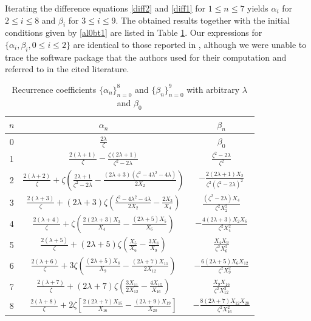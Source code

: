 \documentclass[11pt,a4paper]{article}
\numberwithin{equation}{section}
\begin{document}
Iterating the difference equations \eqref{diff2} and \eqref{diff1} for $1\leq n\leq7$ yields $\alpha_i$ for $2\leq i\leq8$ and $\beta_i$ for $3\leq i\leq9$. The obtained results together with the initial conditions given by \eqref{al0bt1} are listed in Table \ref{Table-1}. Our expressions for $\{\alpha_i,\beta_i, 0\leq i\leq 2\}$ are identical to those reported in \cite[Table 1]{MCM}, although we were unable to trace the software package that the authors used for their computation and referred to in the cited literature.
\begin{table}[H]
\centering
\renewcommand{\arraystretch}{1.2}
\setlength{\tabcolsep}{3pt}
\caption{Recurrence coefficients $\{\alpha_n\}_{n=0}^8$ and $\{\beta_n\}_{n=0}^9$ with arbitrary $\lambda$ and  $\beta_0$}\label{Table-1}
\begin{tabular}{|c|c|c|}
\hline
$n$ & $\alpha_n$ & $\beta_n$\\
\hline
0 & $\frac{2\lambda}{\zeta}$ & $\beta_{0}$ \\
\hline
1 & $\frac{2(\lambda+1)}{\zeta}-\frac{\zeta(2\lambda+1)}{\zeta^2-2\lambda}$ & $\frac{\zeta^2-2\lambda}{\zeta^2}$ \\
\hline
2 & $\frac{2(\lambda+2)}{\zeta}+\zeta\left(\frac{2\lambda+1}{\zeta^2-2\lambda}-\frac{(2\lambda+3) (\zeta^2-4\lambda^2-4\lambda)}{2X_{2}}\right)$ & $-\frac{2(2\lambda+1)X_{2}}{\zeta^2(\zeta^2-2\lambda)^2}$ \\
\hline
3 & $\frac{2(\lambda+3)}{\zeta}+(2\lambda+3)\zeta\left(\frac{ \zeta^2-4\lambda^2-4\lambda}{2X_{2}}-\frac{2X_{3}}{X_{4}}\right)$ & $\frac{(\zeta^2-2\lambda)X_{4}}{\zeta^2X_{2}^2}$  \\
\hline
4 &$\frac{2(\lambda+4)}{\zeta}+\zeta\left(\frac{2(2\lambda+3)X_{3}}{X_{4}}-\frac{(2\lambda+5)X_{5}}{X_{6}}\right)$&$-\frac{4(2\lambda+3)X_{2}X_{6}}{\zeta^2X_{4}^2}$ \\
\hline
5 &$\frac{2(\lambda+5)}{\zeta}+(2\lambda+5)\zeta\left(\frac{X_{5}}{X_{6}}-\frac{3X_{8}}{X_{9}}\right)$&$\frac{X_{4}X_{9}}{\zeta^2X_{6}^2}$ \\
\hline
6 &$\frac{2(\lambda+6)}{\zeta}+3\zeta\left(\frac{(2\lambda+5)X_{8}}{X_{9}}-\frac{(2\lambda+7)X_{11}}{2X_{12}}\right)
$& $-\frac{6(2\lambda+5)X_{6}X_{12}}{\zeta^2X_{9}^{2}}$\\
\hline
7&$\frac{2(\lambda+7)}{\zeta}+(2\lambda+7)\zeta\left(\frac{3X_{11}}{2X_{12}}-\frac{4X_{15}}{X_{16}}\right)$&$\frac{X_{9}X_{16}}{\zeta^2X_{12}^{2}}$\\
\hline
8&$\frac{2(\lambda+8)}{\zeta}+2\zeta\left[\frac{2(2\lambda+7)X_{15}}{X_{16}}-\frac{(2\lambda+9)X_{19}}{X_{20}}\right]$&$-\frac{8(2\lambda+7)X_{12}X_{20}}{\zeta^2X_{16}^{2}}$\\\hline

\end{tabular}
\end{table}
\end{document}
